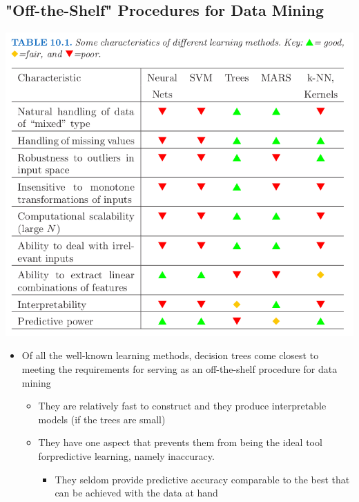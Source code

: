 \documentclass[11pt]{article}
\begin{document}
\subsection{"Off-the-Shelf" Procedures for Data Mining}
\label{sec:orgedb7c3f}
\begin{center}
\includegraphics[width=.9\linewidth]{Boosting and Additive Trees/screenshot_2018-10-22_09-27-14.png}
\end{center}

\begin{itemize}
\item Of all the well-known learning methods, decision trees come closest to meeting the requirements for serving as an off-the-shelf procedure for data mining
\begin{itemize}
\item They are relatively fast to construct and they produce interpretable models (if the trees are small)
\item They have one aspect that prevents them from being the ideal tool forpredictive learning, namely inaccuracy.
\begin{itemize}
\item They seldom provide predictive accuracy comparable to the best that can be achieved with the data at hand
\end{itemize}
\end{itemize}
\end{itemize}
\end{document}
